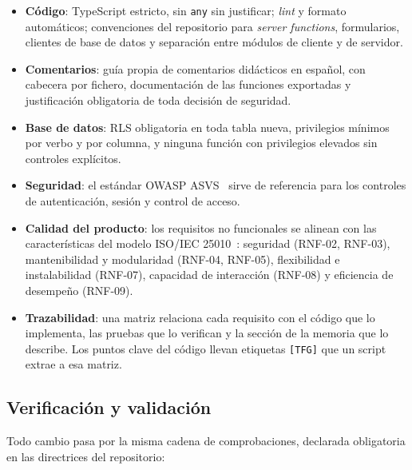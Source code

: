 \begin{itemize}
  \item \textbf{Código}: TypeScript estricto, sin \texttt{any} sin
        justificar; \textit{lint} y formato automáticos; convenciones del
        repositorio para \textit{server functions}, formularios, clientes de
        base de datos y separación entre módulos de cliente y de servidor.
  \item \textbf{Comentarios}: guía propia de comentarios didácticos en
        español, con cabecera por fichero, documentación de las funciones
        exportadas y justificación obligatoria de toda decisión de seguridad.
  \item \textbf{Base de datos}: RLS obligatoria en toda tabla nueva,
        privilegios mínimos por verbo y por columna, y ninguna función con
        privilegios elevados sin controles explícitos.
  \item \textbf{Seguridad}: el estándar OWASP ASVS~\cite{owasp-asvs} sirve de
        referencia para los controles de autenticación, sesión y control de
        acceso.
  \item \textbf{Calidad del producto}: los requisitos no funcionales se
        alinean con las características del modelo ISO/IEC
        25010~\cite{iso25010}: seguridad (RNF-02, RNF-03), mantenibilidad y
        modularidad (RNF-04, RNF-05), flexibilidad e instalabilidad (RNF-07),
        capacidad de interacción (RNF-08) y eficiencia de desempeño (RNF-09).
  \item \textbf{Trazabilidad}: una matriz relaciona cada requisito con el
        código que lo implementa, las pruebas que lo verifican y la sección de
        la memoria que lo describe. Los puntos clave del código llevan
        etiquetas \texttt{[TFG]} que un script extrae a esa matriz.
\end{itemize}

\subsection{Verificación y validación}

Todo cambio pasa por la misma cadena de comprobaciones, declarada obligatoria
en las directrices del repositorio:


